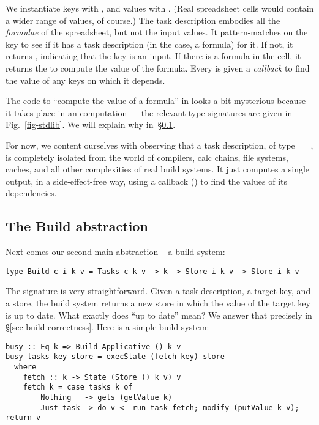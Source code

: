 \noindent
We instantiate keys  with , and values  with .
(Real spreadsheet cells would contain a wider range of values, of course.) The
task description  embodies all the \emph{formulae} of the spreadsheet,
but not the input values. It pattern-matches on the key to see if it has a task
description (in the \Excel case, a formula) for it. If not, it returns
, indicating that the key is an input. If there is a formula in the
cell, it returns the  to compute the value of the formula. Every
 is given a \emph{callback}  to find the value of any keys on
which it depends.

The code to ``compute the value of a formula'' in  looks a bit
mysterious because it takes place in an 
computation~\cite{mcbride2008applicative} -- the relevant type signatures are
given in Fig.~\ref{fig-stdlib}. We will explain why in~\S\ref{sec-general-build}.

For now, we content ourselves with observing that a task description, of type
~~~, is completely isolated from the world of
compilers, calc chains, file systems, caches, and all other complexities of real
build systems. It just computes a single output, in a side-effect-free way,
using a callback () to find the values of its dependencies.

\subsection{The Build abstraction}\label{sec-general-build}

Next comes our second main abstraction -- a build system:

\vspace{1mm}
\begin{verbatim}
type Build c i k v = Tasks c k v -> k -> Store i k v -> Store i k v
\end{verbatim}
\vspace{1mm}

\noindent
The signature is very straightforward. Given a task description, a target key,
and a store, the build system returns a new store in which the value of the
target key is up to date. What exactly does ``up to date'' mean?  We answer
that precisely in \S\ref{sec-build-correctness}. Here is a simple build system:

\vspace{1mm}
\begin{verbatim}
busy :: Eq k => Build Applicative () k v
busy tasks key store = execState (fetch key) store
  where
    fetch :: k -> State (Store () k v) v
    fetch k = case tasks k of
        Nothing   -> gets (getValue k)
        Just task -> do v <- run task fetch; modify (putValue k v); return v
\end{verbatim}
\vspace{1mm}


